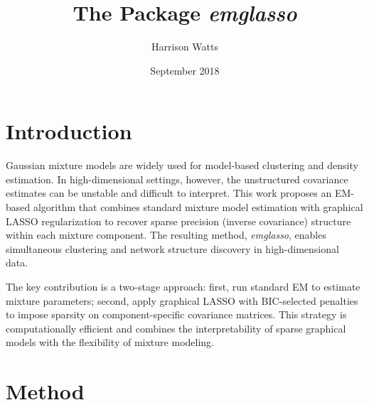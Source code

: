 \documentclass[10pt]{amsart}
\title{The Package \emph{emglasso}}
\author{Harrison Watts }
\date{September 2018}
\begin{document}
\maketitle
\doublespacing

\section{Introduction}

Gaussian mixture models are widely used for model-based clustering and density estimation. In high-dimensional settings, however, the unstructured covariance estimates can be unstable and difficult to interpret. This work proposes an EM-based algorithm that combines standard mixture model estimation with graphical LASSO regularization to recover sparse precision (inverse covariance) structure within each mixture component. The resulting method, \emph{emglasso}, enables simultaneous clustering and network structure discovery in high-dimensional data.

The key contribution is a two-stage approach: first, run standard EM to estimate mixture parameters; second, apply graphical LASSO with BIC-selected penalties to impose sparsity on component-specific covariance matrices. This strategy is computationally efficient and combines the interpretability of sparse graphical models with the flexibility of mixture modeling.

\section{Method} 
\end{document}
